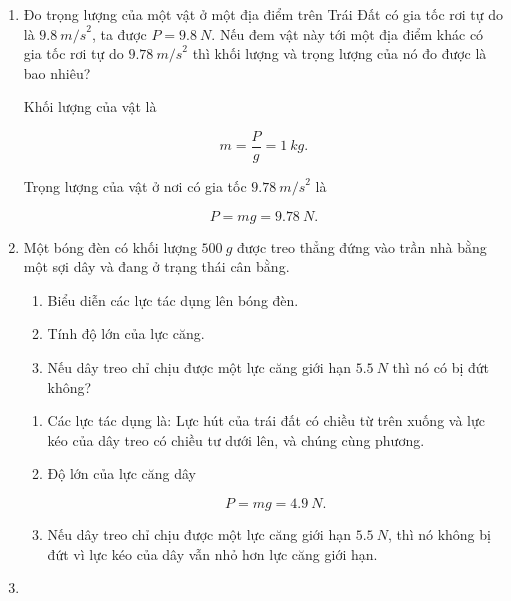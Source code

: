 \begin{enumerate}[label=\bfseries Bài \arabic*:]
{		
	}
	
	
	\item {}
	
	
	{Đo trọng lượng của một vật ở một địa điểm trên Trái Đất có gia tốc rơi tự do là $\SI{9,8}{m/s}^2$, ta được $P = \SI{9,8}{N}$. Nếu đem vật này tới một địa điểm khác có gia tốc rơi tự do $\SI{9,78}{m/s}^2$ thì khối lượng và trọng lượng của nó đo được là bao nhiêu?
	}
	
	\hideall
	{
		Khối lượng của vật là
		
		$$ m = \dfrac{P}{g} = \SI{1}{kg}.$$
		
		Trọng lượng của vật ở nơi có gia tốc $\SI{9,78}{m/s}^2$ là
		
		$$P= mg = \SI{9,78}{N}.$$
	}
	\item {}
	
	
	{Một bóng đèn có khối lượng $\SI{500}{g}$ được treo thẳng đứng vào trần nhà bằng một sợi dây và đang ở trạng thái cân bằng.
		\begin{enumerate}[label=\alph*)]
			\item Biểu diễn các lực tác dụng lên bóng đèn.
			\item Tính độ lớn của lực căng. 
			\item Nếu dây treo chỉ chịu được một lực căng giới hạn $\SI{5,5}{N}$ thì nó có bị đứt không?
		\end{enumerate}
		
	}
	
	\hideall
	{
		\begin{enumerate}[label=\alph*)]
			\item Các lực tác dụng là: Lực hút của trái đất có chiều từ trên xuống và lực kéo của dây treo có chiều tư dưới lên, và chúng cùng phương.
			
			\item Độ lớn của lực căng dây 
			
			$$P= mg = \SI{4,9}{N}.$$
			
			\item 
			
			Nếu dây treo chỉ chịu được một lực căng giới hạn $\SI{5,5}{N}$, thì nó không bị đứt vì lực kéo của dây vẫn nhỏ hơn lực căng giới hạn.
		\end{enumerate}
	}
	\item {}
	

\end{enumerate}
